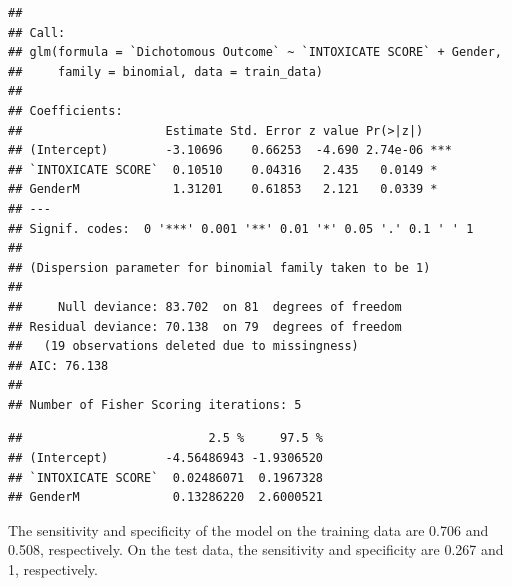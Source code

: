 \documentclass[
]{article}
\begin{document}
\begin{verbatim}
## 
## Call:
## glm(formula = `Dichotomous Outcome` ~ `INTOXICATE SCORE` + Gender, 
##     family = binomial, data = train_data)
## 
## Coefficients:
##                    Estimate Std. Error z value Pr(>|z|)    
## (Intercept)        -3.10696    0.66253  -4.690 2.74e-06 ***
## `INTOXICATE SCORE`  0.10510    0.04316   2.435   0.0149 *  
## GenderM             1.31201    0.61853   2.121   0.0339 *  
## ---
## Signif. codes:  0 '***' 0.001 '**' 0.01 '*' 0.05 '.' 0.1 ' ' 1
## 
## (Dispersion parameter for binomial family taken to be 1)
## 
##     Null deviance: 83.702  on 81  degrees of freedom
## Residual deviance: 70.138  on 79  degrees of freedom
##   (19 observations deleted due to missingness)
## AIC: 76.138
## 
## Number of Fisher Scoring iterations: 5
\end{verbatim}

\begin{verbatim}
##                          2.5 %     97.5 %
## (Intercept)        -4.56486943 -1.9306520
## `INTOXICATE SCORE`  0.02486071  0.1967328
## GenderM             0.13286220  2.6000521
\end{verbatim}

The sensitivity and specificity of the model on the training data are 0.706 and 0.508, respectively. On the test data, the sensitivity and specificity are 0.267 and 1, respectively.
\end{document}

